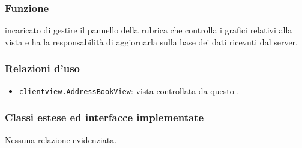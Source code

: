 
\subsubsection*{Funzione}
 incaricato di gestire il pannello della rubrica che controlla i  grafici relativi alla vista e ha la responsabilità di aggiornarla sulla base dei dati ricevuti dal server.

\subsubsection*{Relazioni d'uso}
\begin{itemize}
  \item \texttt{clientview.AddressBookView}: vista controllata da questo .
\end{itemize}

\subsubsection*{Classi estese ed interfacce implementate}
Nessuna relazione evidenziata.

